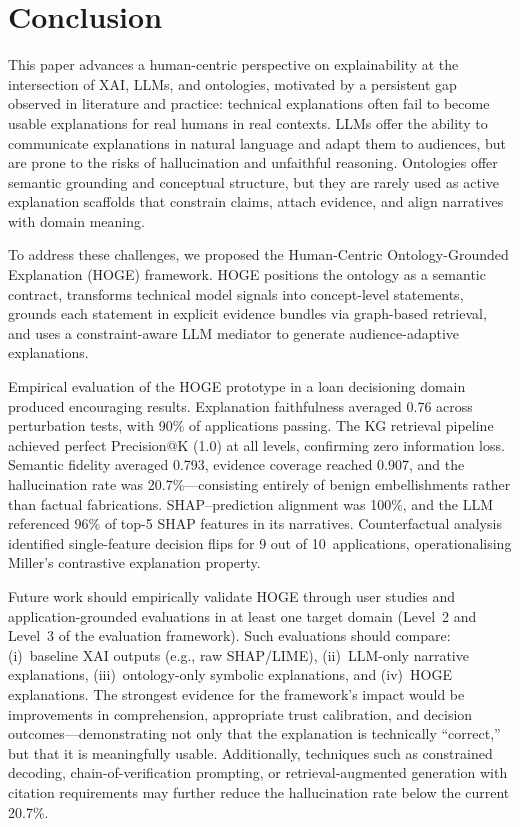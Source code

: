 \documentclass[lnbip]{svmultln}
\begin{document}
\section{Conclusion}

This paper advances a human-centric perspective on explainability at the intersection of XAI, LLMs, and ontologies, motivated by a persistent gap observed in literature and practice: technical explanations often fail to become usable explanations for real humans in real contexts. LLMs offer the ability to communicate explanations in natural language and adapt them to audiences, but are prone to the risks of hallucination and unfaithful reasoning. Ontologies offer semantic grounding and conceptual structure, but they are rarely used as active explanation scaffolds that constrain claims, attach evidence, and align narratives with domain meaning.

To address these challenges, we proposed the Human-Centric Ontology-Grounded Explanation (HOGE) framework. HOGE positions the ontology as a semantic contract, transforms technical model signals into concept-level statements, grounds each statement in explicit evidence bundles via graph-based retrieval, and uses a constraint-aware LLM mediator to generate audience-adaptive explanations.

Empirical evaluation of the HOGE prototype in a loan decisioning domain produced encouraging results. Explanation faithfulness averaged 0.76 across perturbation tests, with 90\% of applications passing. The KG retrieval pipeline achieved perfect Precision@K (1.0) at all levels, confirming zero information loss. Semantic fidelity averaged 0.793, evidence coverage reached 0.907, and the hallucination rate was 20.7\%---consisting entirely of benign embellishments rather than factual fabrications. SHAP--prediction alignment was 100\%, and the LLM referenced 96\% of top-5 SHAP features in its narratives. Counterfactual analysis identified single-feature decision flips for 9 out of 10~applications, operationalising Miller's contrastive explanation property.

Future work should empirically validate HOGE through user studies and application-grounded evaluations in at least one target domain (Level~2 and Level~3 of the evaluation framework). Such evaluations should compare: (i)~baseline XAI outputs (e.g., raw SHAP/LIME), (ii)~LLM-only narrative explanations, (iii)~ontology-only symbolic explanations, and (iv)~HOGE explanations. The strongest evidence for the framework's impact would be improvements in comprehension, appropriate trust calibration, and decision outcomes---demonstrating not only that the explanation is technically ``correct,'' but that it is meaningfully usable. Additionally, techniques such as constrained decoding, chain-of-verification prompting, or retrieval-augmented generation with citation requirements may further reduce the hallucination rate below the current 20.7\%.
\end{document}
